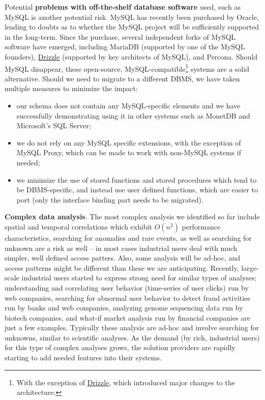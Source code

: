 \documentclass[DM,lsstdraft,toc]{lsstdoc}
\begin{document}
Potential \textbf{problems with off-the-shelf database software} used,
such as MySQL is another potential risk. MySQL has recently been
purchased by Oracle, leading to doubts as to whether the MySQL project
will be sufficiently supported in the long-term. Since the purchase,
several independent forks of MySQL software have emerged, including
MariaDB (supported by one of the MySQL founders),
\href{http://drizzle.org/}{Drizzle} (supported by key architects of
MySQL), and Percona. Should MySQL disappear, these open-source,
MySQL-compatible\footnote{With the exception of
  \href{http://drizzle.org/}{Drizzle}, which introduced major changes to
  the architecture.} systems are a solid alternative. Should we need to
migrate to a different DBMS, we have taken multiple measures to minimize
the impact:

\begin{itemize}
\item
  our schema does not contain any MySQL-specific elements and we have
  successfully demonstrating using it in other systems such as MonetDB
  and Microsoft's SQL Server;
\item
  we do not rely on any MySQL specific extensions, with the exception of
  MySQL Proxy, which can be made to work with non-MySQL systems if
  needed;
\item
  we minimize the use of stored functions and stored procedures which
  tend to be DBMS-specific, and instead use user defined functions,
  which are easier to port (only the interface binding part needs to be
  migrated).
\end{itemize}

\textbf{Complex data analysis}. The most complex analysis we identified
so far include spatial and temporal correlations which exhibit
\(O(n^2)\) performance characteristics, searching for anomalies and rare
events, as well as searching for unknown are a risk as well -- in most
cases industrial users deal with much simpler, well defined access
patters. Also, some analysis will be ad-hoc, and access patterns might
be different than these we are anticipating. Recently, large-scale
industrial users started to express strong need for similar types of
analyses; understanding and correlating user behavior (time-series of
user clicks) run by web companies, searching for abnormal user behavior
to detect fraud activities run by banks and web companies, analyzing
genome sequencing data run by biotech companies, and what-if market
analysis run by financial companies are just a few examples. Typically
these analysis are ad-hoc and involve searching for unknowns, similar to
scientific analyses. As the demand (by rich, industrial users) for this
type of complex analyses grows, the solution providers are rapidly
starting to add needed features into their systems.
\end{document}
